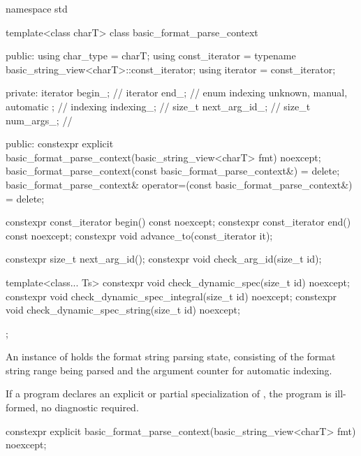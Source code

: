 %
%
%
%
\begin{codeblock}
namespace std {
  template<class charT>
  class basic_format_parse_context {
  public:
    using char_type = charT;
    using const_iterator = typename basic_string_view<charT>::const_iterator;
    using iterator = const_iterator;

  private:
    iterator begin_;                                    // \expos
    iterator end_;                                      // \expos
    enum indexing { unknown, manual, automatic };       // \expos
    indexing indexing_;                                 // \expos
    size_t next_arg_id_;                                // \expos
    size_t num_args_;                                   // \expos

  public:
    constexpr explicit basic_format_parse_context(basic_string_view<charT> fmt) noexcept;
    basic_format_parse_context(const basic_format_parse_context&) = delete;
    basic_format_parse_context& operator=(const basic_format_parse_context&) = delete;

    constexpr const_iterator begin() const noexcept;
    constexpr const_iterator end() const noexcept;
    constexpr void advance_to(const_iterator it);

    constexpr size_t next_arg_id();
    constexpr void check_arg_id(size_t id);

    template<class... Ts>
      constexpr void check_dynamic_spec(size_t id) noexcept;
    constexpr void check_dynamic_spec_integral(size_t id) noexcept;
    constexpr void check_dynamic_spec_string(size_t id) noexcept;
  };
}
\end{codeblock}

\pnum
An instance of  holds
the format string parsing state, consisting of
the format string range being parsed and
the argument counter for automatic indexing.

\pnum
If a program declares an explicit or partial specialization of
,
the program is ill-formed, no diagnostic required.

%
\begin{itemdecl}
constexpr explicit basic_format_parse_context(basic_string_view<charT> fmt) noexcept;
\end{itemdecl}

